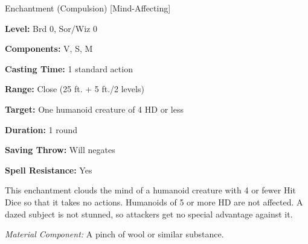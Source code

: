
Enchantment (Compulsion) [Mind-Affecting]

\textbf{Level:} Brd 0, Sor/Wiz 0

\textbf{Components:} V, S, M

\textbf{Casting Time:} 1 standard action

\textbf{Range:} Close (25 ft. + 5 ft./2 levels)

\textbf{Target:} One humanoid creature of 4 HD or less

\textbf{Duration:} 1 round

\textbf{Saving Throw:} Will negates

\textbf{Spell Resistance:} Yes

This enchantment clouds the mind of a humanoid creature with 4 or fewer Hit Dice 
so that it takes no actions. Humanoids of 5 or more HD are not affected. A dazed 
subject is not stunned, so attackers get no special advantage against it.

\textit{Material Component:} A pinch of wool or similar substance.


